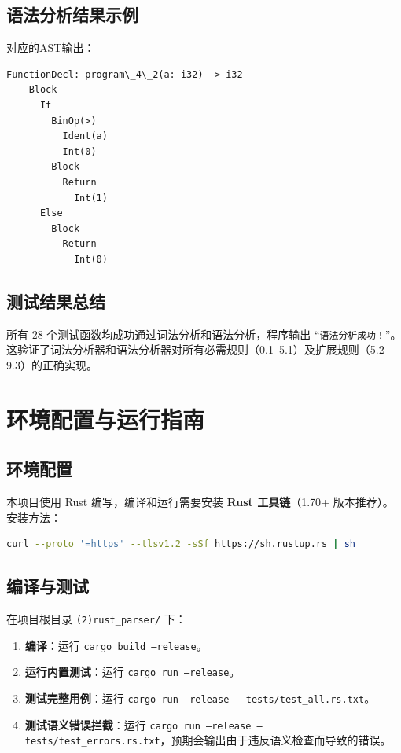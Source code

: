 \documentclass[12pt,a4paper]{ctexart}
\begin{document}
\subsection{语法分析结果示例}

对应的AST输出：
\begin{lstlisting}[basicstyle=\footnotesize\ttfamily]
  FunctionDecl: program\_4\_2(a: i32) -> i32
    Block
      If
        BinOp(>)
          Ident(a)
          Int(0)
        Block
          Return
            Int(1)
      Else
        Block
          Return
            Int(0)
\end{lstlisting}

\subsection{测试结果总结}

所有 28 个测试函数均成功通过词法分析和语法分析，程序输出 “\texttt{语法分析成功！}”。这验证了词法分析器和语法分析器对所有必需规则（0.1--5.1）及扩展规则（5.2--9.3）的正确实现。


\section{环境配置与运行指南}

\subsection{环境配置}
本项目使用 Rust 编写，编译和运行需要安装 \textbf{Rust 工具链}（1.70+ 版本推荐）。安装方法：
\begin{lstlisting}[language=bash]
curl --proto '=https' --tlsv1.2 -sSf https://sh.rustup.rs | sh
\end{lstlisting}

\subsection{编译与测试}
在项目根目录 \texttt{(2)rust\_parser/} 下：
\begin{enumerate}
    \item \textbf{编译}：运行 \texttt{cargo build --release}。
    \item \textbf{运行内置测试}：运行 \texttt{cargo run --release}。
    \item \textbf{测试完整用例}：运行 \texttt{cargo run --release -- tests/test\_all.rs.txt}。
    \item \textbf{测试语义错误拦截}：运行 \texttt{cargo run --release -- tests/test\_errors.rs.txt}，预期会输出由于违反语义检查而导致的错误。
\end{enumerate}
\end{document}
